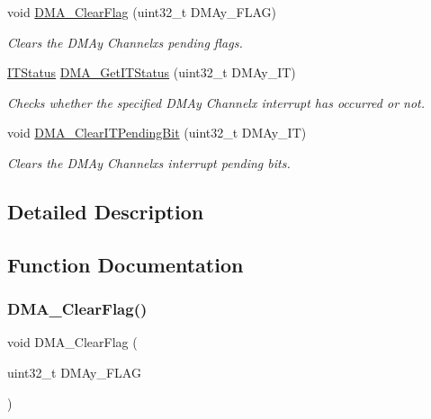 \begin{DoxyCompactItemize}
void \mbox{\hyperlink{group___d_m_a___exported___functions_ga25cdca360f309c8ceb7c206cd9ad9119}{D\+M\+A\+\_\+\+Clear\+Flag}} (uint32\+\_\+t D\+M\+Ay\+\_\+\+F\+L\+AG)
\begin{DoxyCompactList}\small\item\em Clears the D\+M\+Ay Channelx\textquotesingle{}s pending flags. \end{DoxyCompactList}\item 
\mbox{\hyperlink{group___exported__types_gaacbd7ed539db0aacd973a0f6eca34074}{I\+T\+Status}} \mbox{\hyperlink{group___d_m_a___exported___functions_ga9287331247150fe84d03ecd7ad8adb52}{D\+M\+A\+\_\+\+Get\+I\+T\+Status}} (uint32\+\_\+t D\+M\+Ay\+\_\+\+IT)
\begin{DoxyCompactList}\small\item\em Checks whether the specified D\+M\+Ay Channelx interrupt has occurred or not. \end{DoxyCompactList}\item 
void \mbox{\hyperlink{group___d_m_a___exported___functions_ga91a7340e5b334a942f3eb1e05ed5f67a}{D\+M\+A\+\_\+\+Clear\+I\+T\+Pending\+Bit}} (uint32\+\_\+t D\+M\+Ay\+\_\+\+IT)
\begin{DoxyCompactList}\small\item\em Clears the D\+M\+Ay Channelx\textquotesingle{}s interrupt pending bits. \end{DoxyCompactList}\end{DoxyCompactItemize}


\subsection{Detailed Description}


\subsection{Function Documentation}
\mbox{\label{group___d_m_a___exported___functions_ga25cdca360f309c8ceb7c206cd9ad9119}} 
\subsubsection{\texorpdfstring{DMA\_ClearFlag()}{DMA\_ClearFlag()}}
{\footnotesize\ttfamily void D\+M\+A\+\_\+\+Clear\+Flag (\begin{DoxyParamCaption}\item[{uint32\+\_\+t}]{D\+M\+Ay\+\_\+\+F\+L\+AG }\end{DoxyParamCaption})}



